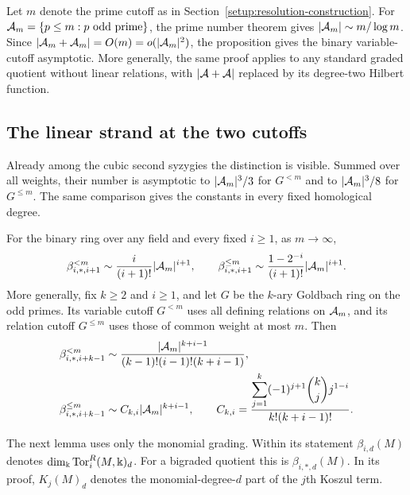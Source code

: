 Let $m$ denote the prime cutoff as in Section~\ref{setup:resolution-construction}.
For $\mathcal A_m=\{p\le m:p\text{ odd prime}\}$, the prime number theorem gives
$|\mathcal A_m|\sim m/\log m$.
Since $|\mathcal A_m+\mathcal A_m|=O(m)=o(|\mathcal A_m|^2)$, the proposition gives the binary
variable-cutoff asymptotic. More generally, the same proof applies to
any standard graded quotient without linear relations, with $|\mathcal A+\mathcal A|$
replaced by its degree-two Hilbert function.

\subsection{The linear strand at the two cutoffs}

Already among the cubic second syzygies the distinction is visible.
Summed over all weights, their number is asymptotic to $|\mathcal A_m|^3/3$
for $G^{<m}$ and to $|\mathcal A_m|^3/8$ for $G^{\le m}$. The same comparison
gives the constants in every fixed homological degree.

\begin{theorem}\label{grow:both-cutoffs}
For the binary ring over any field and every fixed $i\ge1$, as $m\to\infty$,
\[
 \beta^{<m}_{i,*,i+1}\sim\frac{i}{(i+1)!}|\mathcal A_m|^{i+1},
 \qquad
 \beta^{\le m}_{i,*,i+1}
       \sim\frac{1-2^{-i}}{(i+1)!}|\mathcal A_m|^{i+1}.
\]
More generally, fix $k\ge2$ and $i\ge1$, and let $G$ be the $k$-ary Goldbach
ring on the odd primes. Its variable cutoff $G^{<m}$ uses all
defining relations on $\mathcal A_m$, and its relation cutoff $G^{\le m}$
uses those of common weight at most $m$. Then
\begin{align}
 \beta^{<m}_{i,*,i+k-1}
 &\sim\frac{|\mathcal A_m|^{k+i-1}}{(k-1)!(i-1)!(k+i-1)},
 \label{grow:variable-constant}\\
 \beta^{\le m}_{i,*,i+k-1}
 &\sim C_{k,i}|\mathcal A_m|^{k+i-1},\qquad
 C_{k,i}=\frac{\displaystyle\sum_{j=1}^k
       (-1)^{j+1}\binom kj j^{1-i}}{k!(k+i-1)!}.
 \label{grow:relation-constant}
\end{align}
\end{theorem}

The next lemma uses only the monomial grading. Within its statement
$\beta_{i,d}(M)$ denotes $\dim_\Bbbk\operatorname{Tor}_i^R(M,\Bbbk)_d$.
For a bigraded quotient this is $\beta_{i,*,d}(M)$.
In its proof, $K_j(M)_d$ denotes the monomial-degree-$d$ part of the
$j$th Koszul term.

